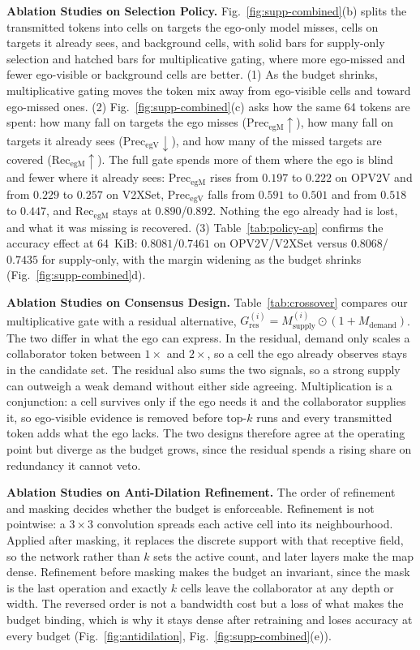 \noindent\textbf{Ablation Studies on Selection Policy.}
Fig.~\ref{fig:supp-combined}(b) splits the transmitted tokens into cells on targets the ego-only model misses, cells on targets it already sees, and background cells, with solid bars for supply-only selection and hatched bars for multiplicative gating, where more ego-missed and fewer ego-visible or background cells are better. (1) As the budget shrinks, multiplicative gating moves the token mix away from ego-visible cells and toward ego-missed ones. (2) Fig.~\ref{fig:supp-combined}(c) asks how the same 64 tokens are spent: how many fall on targets the ego misses ($\mathrm{Prec}_{\mathrm{egM}}\!\uparrow$), how many fall on targets it already sees ($\mathrm{Prec}_{\mathrm{egV}}\!\downarrow$), and how many of the missed targets are covered ($\mathrm{Rec}_{\mathrm{egM}}\!\uparrow$). The full gate spends more of them where the ego is blind and fewer where it already sees: $\mathrm{Prec}_{\mathrm{egM}}$ rises from $0.197$ to $0.222$ on OPV2V and from $0.229$ to $0.257$ on V2XSet, $\mathrm{Prec}_{\mathrm{egV}}$ falls from $0.591$ to $0.501$ and from $0.518$ to $0.447$, and $\mathrm{Rec}_{\mathrm{egM}}$ stays at $0.890$/$0.892$. Nothing the ego already had is lost, and what it was missing is recovered. (3) Table~\ref{tab:policy-ap} confirms the accuracy effect at 64~KiB: $0.8081$/$0.7461$ on OPV2V/V2XSet versus $0.8068$/$0.7435$ for supply-only, with the margin widening as the budget shrinks (Fig.~\ref{fig:supp-combined}d).

\noindent\textbf{Ablation Studies on Consensus Design.}
Table~\ref{tab:crossover} compares our multiplicative gate with a residual alternative, $G_{\text{res}}^{(i)} = M_{\text{supply}}^{(i)} \odot (1 + M_{\text{demand}})$. The two differ in what the ego can express. In the residual, demand only scales a collaborator token between $1\times$ and $2\times$, so a cell the ego already observes stays in the candidate set. The residual also sums the two signals, so a strong supply can outweigh a weak demand without either side agreeing. Multiplication is a conjunction: a cell survives only if the ego needs it and the collaborator supplies it, so ego-visible evidence is removed before top-$k$ runs and every transmitted token adds what the ego lacks. The two designs therefore agree at the operating point but diverge as the budget grows, since the residual spends a rising share on redundancy it cannot veto.

\noindent\textbf{Ablation Studies on Anti-Dilation Refinement.}
The order of refinement and masking decides whether the budget is enforceable. Refinement is not pointwise: a $3\times3$ convolution spreads each active cell into its neighbourhood. Applied after masking, it replaces the discrete support with that receptive field, so the network rather than $k$ sets the active count, and later layers make the map dense. Refinement before masking makes the budget an invariant, since the mask is the last operation and exactly $k$ cells leave the collaborator at any depth or width. The reversed order is not a bandwidth cost but a loss of what makes the budget binding, which is why it stays dense after retraining and loses accuracy at every budget (Fig.~\ref{fig:antidilation}, Fig.~\ref{fig:supp-combined}(e)).


